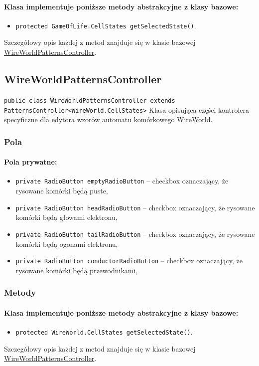 \documentclass{report}
\begin{document}
\paragraph{Klasa implementuje poniższe metody abstrakcyjne z klasy bazowe:}
\begin{itemize}
 	\item \texttt{protected GameOfLife.CellStates getSelectedState()}.
\end{itemize}
Szczegółowy opis każdej z metod znajduje się w klasie bazowej \hyperref[subsec:cellularAutomaton]{WireWorldPatternsController}.

\subsection{WireWorldPatternsController}
\texttt{public class WireWorldPatternsController extends PatternsController<WireWorld.CellStates>}
Klasa opisująca części kontrolera specyficzne dla edytora wzorów automatu komórkowego WireWorld.
\subsubsection{Pola}
\paragraph{Pola prywatne:}
\begin{itemize}	\label{sec:checkbox}
	\item \texttt{private RadioButton emptyRadioButton} -- checkbox oznaczający, że rysowane komórki będą puste,
	\item \texttt{private RadioButton headRadioButton} -- checkbox oznaczający, że rysowane komórki będą głowami elektronu,
	\item \texttt{private RadioButton tailRadioButton} -- checkbox oznaczający, że rysowane komórki będą ogonami elektronu,
	\item \texttt{private RadioButton conductorRadioButton} -- checkbox oznaczający, że rysowane komórki będą przewodnikami,
\end{itemize}

\subsubsection{Metody}
\paragraph{Klasa implementuje poniższe metody abstrakcyjne z klasy bazowe:}
\begin{itemize}
 	\item \texttt{protected WireWorld.CellStates getSelectedState()}.
\end{itemize}
Szczegółowy opis każdej z metod znajduje się w klasie bazowej \hyperref[subsec:cellularAutomaton]{WireWorldPatternsController}.
\end{document}
